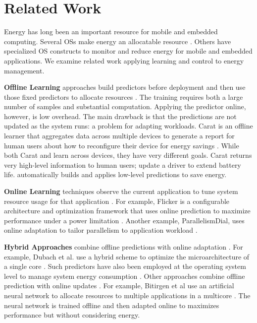 \section{Related Work}
Energy has long been an important resource for mobile and embedded
computing.  Several OSs make energy an allocatable resource
\cite{Koala,Cinder,PowerContainers}.  Others have specialized OS
constructs to monitor \cite{quanto} and reduce
\cite{JouleGuard,flinn99,grace,grace2,Drowsy} energy for mobile and
embedded applications. We examine related work applying learning and
control to energy management.


\noindent \textbf{Offline Learning} approaches build predictors before
deployment and then use those fixed predictors to allocate resources
\cite{Yi2003,LeeBrooks2006,CPR,ChenJohn2011,petabricksStatic}.  The
training requires both a large number of samples and substantial
computation.  Applying the predictor online, however, is low overhead.
The main drawback is that the predictions are not updated as the
system runs: a problem for adapting workloads.  Carat is an offline
learner that aggregates data across multiple devices to generate a
report for human users about how to reconfigure their device for
energy savings \cite{carat}.  While both Carat and \SYSTEM{} learn
across devices, they have very different goals.  Carat returns very
high-level information to human users; \eg{} update a driver to extend
battery life.  \SYSTEM{} automatically builds and applies low-level
predictions to save energy.

\noindent \textbf{Online Learning} techniques observe the current
application to tune system resource usage for that application
\cite{Li2006,Flicker,ParallelismDial,Ponamarev,petabricksDynamic,LeeBrooks}.
For example, Flicker is a configurable architecture and optimization
framework that uses online prediction to maximize performance under a
power limitation \cite{Flicker}.  Another example, ParallelismDial,
uses online adaptation to tailor parallelism to application workload
\cite{ParallelismDial}.



\noindent \textbf{Hybrid Approaches} combine offline predictions with
online adaptation
\cite{Zhang2012,packandcap,Winter2010,dubach2010,Koala,Cinder,
  wu2012inferred}.  For example, Dubach et al.  use a hybrid scheme to
optimize the microarchitecture of a single core \cite{dubach2010}.
Such predictors have also been employed at the operating system level
to manage system energy consumption
\cite{Koala,Cinder,wu2012inferred}.  Other approaches combine offline
prediction with online updates \cite{JouleGuard,Bitirgen2008,Ipek}.
For example, Bitirgen et al use an artificial neural network to
allocate resources to multiple applications in a multicore
\cite{Bitirgen2008}.  The neural network is trained offline and then
adapted online to maximizes performance but without considering
energy.



